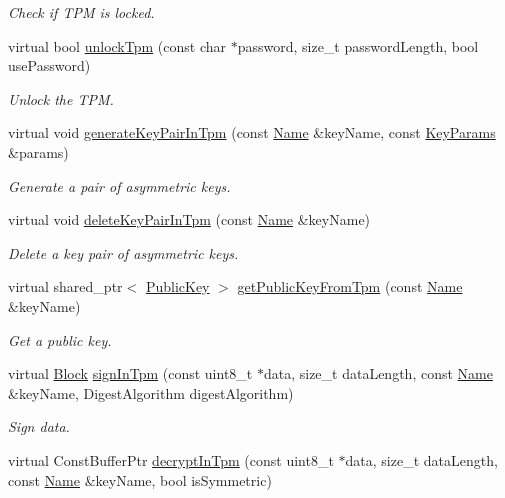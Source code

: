\begin{DoxyCompactItemize}
\begin{DoxyCompactList}\small\item\em Check if T\+PM is locked. \end{DoxyCompactList}\item 
virtual bool \hyperlink{classndn_1_1SecTpmOsx_aa956246afe6970ed5b65c1f832d296ee}{unlock\+Tpm} (const char $\ast$password, size\+\_\+t password\+Length, bool use\+Password)
\begin{DoxyCompactList}\small\item\em Unlock the T\+PM. \end{DoxyCompactList}\item 
virtual void \hyperlink{classndn_1_1SecTpmOsx_ae5beb2591714fab01a779a881d6a69ea}{generate\+Key\+Pair\+In\+Tpm} (const \hyperlink{classndn_1_1Name}{Name} \&key\+Name, const \hyperlink{classndn_1_1KeyParams}{Key\+Params} \&params)
\begin{DoxyCompactList}\small\item\em Generate a pair of asymmetric keys. \end{DoxyCompactList}\item 
virtual void \hyperlink{classndn_1_1SecTpmOsx_ad0066d4dd7d1a463d0ac06ea5f3cc2e4}{delete\+Key\+Pair\+In\+Tpm} (const \hyperlink{classndn_1_1Name}{Name} \&key\+Name)
\begin{DoxyCompactList}\small\item\em Delete a key pair of asymmetric keys. \end{DoxyCompactList}\item 
virtual shared\+\_\+ptr$<$ \hyperlink{classndn_1_1PublicKey}{Public\+Key} $>$ \hyperlink{classndn_1_1SecTpmOsx_a5f44033345b2088f418e7e24aac1e0f0}{get\+Public\+Key\+From\+Tpm} (const \hyperlink{classndn_1_1Name}{Name} \&key\+Name)
\begin{DoxyCompactList}\small\item\em Get a public key. \end{DoxyCompactList}\item 
virtual \hyperlink{classndn_1_1Block}{Block} \hyperlink{classndn_1_1SecTpmOsx_a3907c12542d01610c48c09a8a7e474d1}{sign\+In\+Tpm} (const uint8\+\_\+t $\ast$data, size\+\_\+t data\+Length, const \hyperlink{classndn_1_1Name}{Name} \&key\+Name, Digest\+Algorithm digest\+Algorithm)
\begin{DoxyCompactList}\small\item\em Sign data. \end{DoxyCompactList}\item 
virtual Const\+Buffer\+Ptr \hyperlink{classndn_1_1SecTpmOsx_a15b014d4206f622aa4d809a9c0d10cdd}{decrypt\+In\+Tpm} (const uint8\+\_\+t $\ast$data, size\+\_\+t data\+Length, const \hyperlink{classndn_1_1Name}{Name} \&key\+Name, bool is\+Symmetric)

\end{DoxyCompactItemize}
